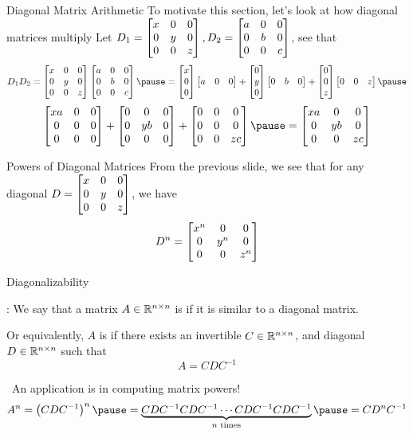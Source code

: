 \documentclass[xcoler=dvipsnames, aspectratio=169]{beamer}
\date{Diagonalizability}
\begin{document}
    \begin{frame}{Diagonal Matrix Arithmetic}
        To motivate this section, let's look at how diagonal matrices multiply
        Let $D_1=\begin{bmatrix}x&0&0\\0&y&0\\0&0&z\end{bmatrix},D_2=\begin{bmatrix}a&0&0\\0&b&0\\0&0&c\end{bmatrix}$, see that\pause
        \[
            D_1D_2 = \bMat{x&0&0\\0&y&0\\0&0&z}\bMat{a&0&0\\0&b&0\\0&0&c} \pause =
            \bMat{x\\0\\0}\bMat{a&0&0} + \bMat{0\\y\\0}\bMat{0&b&0} + \bMat{0\\0\\z}\bMat{0&0&z}\pause
        \]
        \[
            \bMat{
                xa & 0 & 0\\
                0 & 0 & 0\\
                0 & 0 & 0
            }+\bMat{
                0 & 0 & 0\\
                0 & yb & 0\\
                0 & 0 & 0
            }+\bMat{
                0 & 0 & 0\\
                0 & 0 & 0\\
                0 & 0 & zc
            }\pause = \bMat{
                xa & 0 & 0\\
                0 & yb & 0\\
                0 & 0 & zc
            }
        \]
    \end{frame}
    \begin{frame}{Powers of Diagonal Matrices}
        From the previous slide, we see that for any diagonal
        $D=\begin{bmatrix}
            x&0&0\\
            0&y&0\\
            0&0&z
        \end{bmatrix}$, we have
        \[
            D^n = \begin{bmatrix}
            x^n&0&0\\
            0&y^n&0\\
            0&0&z^n
        \end{bmatrix}
        \]
    \end{frame}
    \begin{frame}{Diagonalizability}
        \begin{defn}
            : We say that a matrix $A\in\mathbb{R}^{n\times n}$ is 
             if it is similar to a diagonal matrix.\pause

            Or equivalently, $A$ is  if there exists an invertible 
            $C\in\mathbb{R}^{n\times n}$, and diagonal $D\in\mathbb{R}^{n\times n}$ such that
            \[
                A = CDC^{-1}
            \]
        \end{defn}
        \pause\
        An application is in computing matrix powers!
        \[
            A^n = \left(CDC^{-1}\right)^n\pause =\underbrace{CDC^{-1}CDC^{-1}\cdots 
            CDC^{-1}CDC^{-1}}_{n\textnormal{ times}}\pause =CD^nC^{-1}
        \]
    \end{frame}
\end{document}
